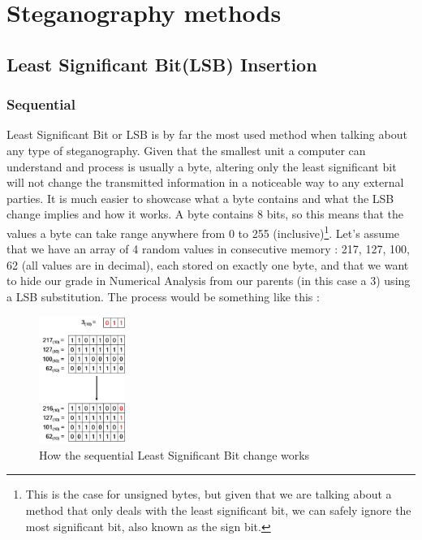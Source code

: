 
\chapter{Steganography methods}


\section{Least Significant Bit(LSB) Insertion} \label{lsb_insertion_chapter}
\begin{multicols*}{2}
\subsection{Sequential}
\setlength\columnsep{20pt}

Least Significant Bit or LSB is by far the most used method when talking about any type of steganography. Given that the smallest unit a computer can understand and process is usually a byte, altering only the least significant bit will not change the transmitted information in a noticeable way to any external parties. It is much easier to showcase what a byte contains and what the LSB change implies and how it works. A byte contains 8 bits, so this means that the values a byte can take range anywhere from 0 to 255 (inclusive)\footnote{This is the case for unsigned bytes, but given that we are talking about a method that only deals with the least significant bit, we can safely ignore the most significant bit, also known as the sign bit.}. Let's assume that we have an array of 4 random values in consecutive memory : 217, 127, 100, 62 (all values are in decimal), each stored on exactly one byte, and that we want to hide our grade in Numerical Analysis from our parents (in this case a 3) using a LSB substitution. The process would be something like this :

\begin{figure}[H]
    \centering
    \includegraphics[width=2.8cm,keepaspectratio]{pics/how_lsb_works}
    \caption{How the sequential Least Significant Bit change works}
    \label{LSB}
\end{figure}


\end{multicols*}

